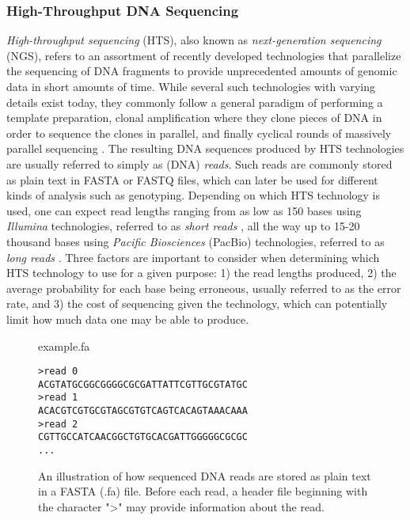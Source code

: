 \subsubsection{High-Throughput DNA Sequencing} \label{background:biology:high_throughput_dna_sequencing}
\textit{High-throughput sequencing} (HTS), also known as \textit{next-generation sequencing} (NGS), refers to an assortment of recently developed technologies that parallelize the sequencing of DNA fragments to provide unprecedented amounts of genomic data in short amounts of time.
While several such technologies with varying details exist today, they commonly follow a general paradigm of performing a template preparation, clonal amplification where they clone pieces of DNA in order to sequence the clones in parallel, and finally cyclical rounds of massively parallel sequencing \cite{hts}.
The resulting DNA sequences produced by HTS technologies are usually referred to simply as (DNA) \textit{reads}.
Such reads are commonly stored as plain text in FASTA or FASTQ files, which can later be used for different kinds of analysis such as genotyping.
Depending on which HTS technology is used, one can expect read lengths ranging from as low as 150 bases using \textit{Illumina} technologies, referred to as \textit{short reads} \cite{illumina_read_length}, all the way up to 15-20 thousand bases using \textit{Pacific Biosciences} (PacBio) technologies, referred to as \textit{long reads} \cite{hts2}.
Three factors are important to consider when determining which HTS technology to use for a given purpose: 1) the read lengths produced, 2) the average probability for each base being erroneous, usually referred to as the error rate, and 3) the cost of sequencing given the technology, which can potentially limit how much data one may be able to produce.

\begin{figure}[H]
\begin{center}
\small{example.fa}
\end{center}
\begin{lstlisting}[style=vcf]
>read 0
ACGTATGCGGCGGGGCGCGATTATTCGTTGCGTATGC
>read 1
ACACGTCGTGCGTAGCGTGTCAGTCACAGTAAACAAA
>read 2
CGTTGCCATCAACGGCTGTGCACGATTGGGGGCGCGC
...
\end{lstlisting}
\caption{
  An illustration of how sequenced DNA reads are stored as plain text in a FASTA (.fa) file.
  Before each read, a header file beginning with the character ">" may provide information about the read.
}
\label{background:biology:high_throughput_dna_sequencing:figures:fasta}
\end{figure}
